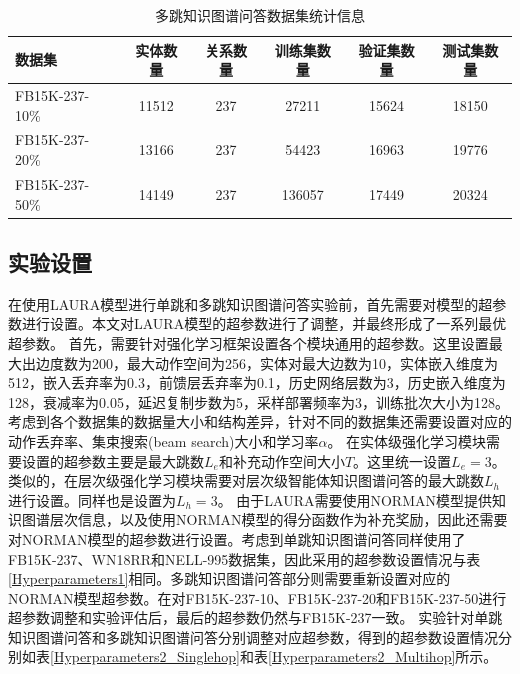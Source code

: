 \documentclass[algorithmlist, AutoFakeBold, AutoFakeSlant, figurelist, tablelist, nomlist, engineering]{seuthesix}
\begin{document}
\begin{table}
  \centering
  \begin{tabular*}{0.95\textwidth}{@{\extracolsep{\fill}}lccccc}
		\toprule[1pt]
    数据集 & 实体数量 & 关系数量 & 训练集数量 & 验证集数量 & 测试集数量 \\ \hline
    FB15K-237-10\% & 11512 & 237 & 27211 & 15624 & 18150\\
    FB15K-237-20\% & 13166 & 237 & 54423 & 16963 & 19776\\
    FB15K-237-50\% & 14149 & 237 & 136057 & 17449 & 20324\\
		\bottomrule[1pt]
	\end{tabular*}
  \caption{多跳知识图谱问答数据集统计信息}
  \label{Datasets2}
\end{table}

\subsection{实验设置}
在使用LAURA模型进行单跳和多跳知识图谱问答实验前，首先需要对模型的超参数进行设置。本文对LAURA模型的超参数进行了调整，并最终形成了一系列最优超参数。
首先，需要针对强化学习框架设置各个模块通用的超参数。这里设置最大出边度数为200，最大动作空间为256，实体对最大边数为10，实体嵌入维度为512，嵌入丢弃率为0.3，前馈层丢弃率为0.1，历史网络层数为3，历史嵌入维度为128，衰减率为0.05，延迟复制步数为5，采样部署频率为3，训练批次大小为128。
考虑到各个数据集的数据量大小和结构差异，针对不同的数据集还需要设置对应的动作丢弃率、集束搜索(beam search)大小和学习率$\alpha$。
在实体级强化学习模块需要设置的超参数主要是最大跳数$L_e$和补充动作空间大小$T$。这里统一设置$L_e = 3$。
类似的，在层次级强化学习模块需要对层次级智能体知识图谱问答的最大跳数$L_h$进行设置。同样也是设置为$L_h = 3$。
由于LAURA需要使用NORMAN模型提供知识图谱层次信息，以及使用NORMAN模型的得分函数作为补充奖励，因此还需要对NORMAN模型的超参数进行设置。考虑到单跳知识图谱问答同样使用了FB15K-237、WN18RR和NELL-995数据集，因此采用的超参数设置情况与表\ref{Hyperparameters1}相同。多跳知识图谱问答部分则需要重新设置对应的NORMAN模型超参数。在对FB15K-237-10、FB15K-237-20和FB15K-237-50进行超参数调整和实验评估后，最后的超参数仍然与FB15K-237一致。
实验针对单跳知识图谱问答和多跳知识图谱问答分别调整对应超参数，得到的超参数设置情况分别如表\ref{Hyperparameters2_Singlehop}和表\ref{Hyperparameters2_Multihop}所示。
\end{document}
